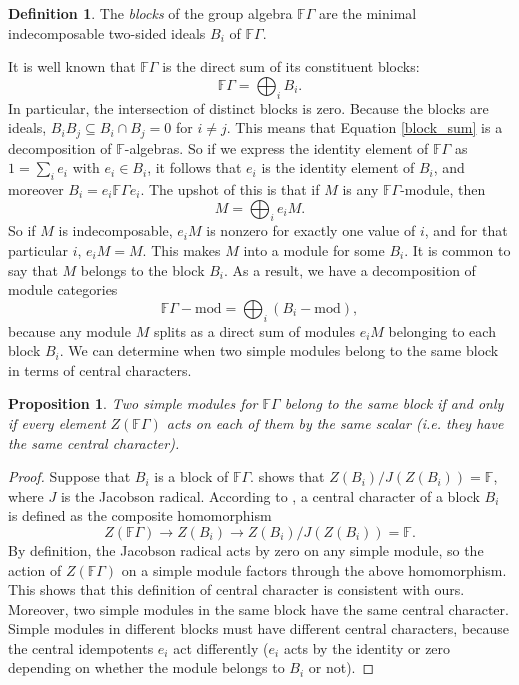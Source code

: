 \documentclass[10pt]{article}
\newtheorem{proposition}[theorem]{Proposition}
\theoremstyle{definition}
\newtheorem{definition}[theorem]{Definition}
\begin{document}
\begin{definition}
The \emph{blocks} of the group algebra $\mathbb{F}\Gamma$ are the minimal indecomposable two-sided ideals $B_i$ of $\mathbb{F}\Gamma$.
\end{definition}

It is well known that $\mathbb{F}\Gamma$ is the direct sum of its constituent blocks:
\begin{equation} \label{block_sum}
\mathbb{F}\Gamma = \bigoplus_i B_i.
\end{equation}
In particular, the intersection of distinct blocks is zero. Because the blocks are ideals, $B_i B_j \subseteq B_i \cap B_j = 0$ for $i \neq j$. This means that Equation \eqref{block_sum} is a decomposition of $\mathbb{F}$-algebras. So if we express the identity element of $\mathbb{F}\Gamma$ as $1 = \sum_i e_i$ with $e_i \in B_i$, it follows that $e_i$ is the identity element of $B_i$, and moreover $B_i = e_i \mathbb{F}\Gamma e_i$. The upshot of this is that if $M$ is any $\mathbb{F}\Gamma$-module, then
\[
M = \bigoplus_i e_i M.
\]
So if $M$ is indecomposable, $e_i M$ is nonzero for exactly one value of $i$, and for that particular $i$, $e_i M = M$. This makes $M$ into a module for some $B_i$. It is common to say that $M$ belongs to the block $B_i$. As a result, we have a decomposition of module categories
\[
\mathbb{F}\Gamma - \mathrm{mod} = \bigoplus_i \left(B_i -\mathrm{mod}\right),
\]
because any module $M$ splits as a direct sum of modules $e_iM$ belonging to each block $B_i$. We can determine when two simple modules belong to the same block in terms of central characters.

\begin{proposition} \label{central_char_blocks}
Two simple modules for $\mathbb{F}\Gamma$ belong to the same block if and only if every element $Z(\mathbb{F}\Gamma)$ acts on each of them by the same scalar \textup{(}i.e. they have the same central character\textup{)}. 
\end{proposition}
\begin{proof}
Suppose that $B_i$ is a block of $\mathbb{F}\Gamma$.  \cite[Lemma 4.1]{modrepfingrp} shows that $Z(B_i)/J(Z(B_i)) = \mathbb{F}$, where $J$ is the Jacobson radical. According to  \cite{modrepfingrp}, a central character of a block $B_i$ is defined as the composite homomorphism
\[
Z(\mathbb{F}\Gamma) \to Z(B_i) \to Z(B_i)/J(Z(B_i)) = \mathbb{F}.
\]
By definition, the Jacobson radical acts by zero on any simple module, so the action of $Z(\mathbb{F}\Gamma)$ on a simple module factors through the above homomorphism. This shows that this definition of central character is consistent with ours. Moreover, two simple modules in the same block have the same central character. Simple modules in different blocks must have different central characters, because the central idempotents $e_i$ act differently ($e_i$ acts by the identity or zero depending on whether the module belongs to $B_i$ or not).
\end{proof}
\end{document}
